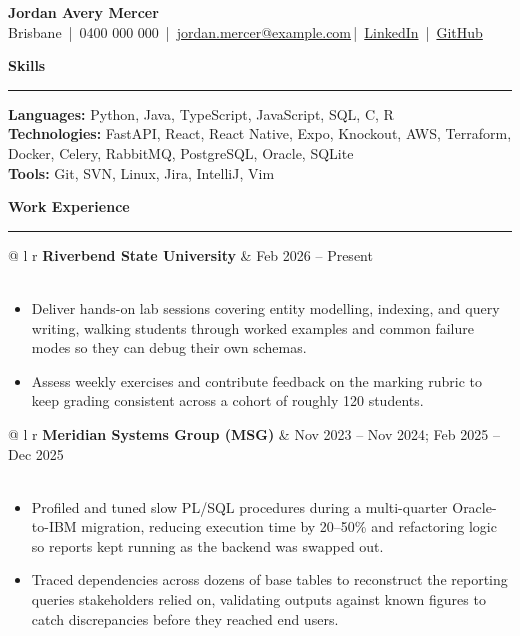 \documentclass[a4paper,10pt]{article}
\newcommand{\resheading}[1]{%
  \vspace{0.8ex}%
  \noindent\textbf{\large #1}\\[-2.0ex]
  \rule{\textwidth}{0.4pt}\vspace{0ex}
}
\begin{document}
\begin{center}
    {\LARGE \textbf{Jordan Avery Mercer}}\\[2pt]
    Brisbane \,|\, 0400 000 000 \,|\, \href{mailto:jordan.mercer@example.com}{jordan.mercer@example.com}\,|\, \href{https://www.linkedin.com/in/example-profile/}{LinkedIn} \,|\, \href{https://github.com/example-user}{GitHub}
\end{center}
\vspace{-3ex} 
\resheading{Skills}
\noindent\textbf{Languages:}
Python, Java, TypeScript, JavaScript, SQL, C, R\\[2pt]
\textbf{Technologies:}
FastAPI, React, React Native, Expo, Knockout, AWS, Terraform, Docker, Celery, RabbitMQ, PostgreSQL, Oracle, SQLite\\[2pt]
\textbf{Tools:}
Git, SVN, Linux, Jira, IntelliJ, Vim

\resheading{Work Experience}
\noindent
\begin{tabular*}{\textwidth}{@{\extracolsep{\fill}} l r}
\textbf{Riverbend State University} & Feb 2026 -- Present \\
 \\
\end{tabular*}
\vspace{-1.5ex}
\begin{itemize}
    \item Deliver hands-on lab sessions covering entity modelling, indexing, and query writing, walking students through worked examples and common failure modes so they can debug their own schemas.
    \item Assess weekly exercises and contribute feedback on the marking rubric to keep grading consistent across a cohort of roughly 120 students.
\end{itemize}

\noindent
\begin{tabular*}{\textwidth}{@{\extracolsep{\fill}} l r}
\textbf{Meridian Systems Group (MSG)} & Nov 2023 -- Nov 2024; Feb 2025 -- Dec 2025\\
  \\
\end{tabular*}
\vspace{-1.5ex}
\begin{itemize}
    \item Profiled and tuned slow PL/SQL procedures during a multi-quarter Oracle-to-IBM migration, reducing execution time by 20–50\% and refactoring logic so reports kept running as the backend was swapped out.
    \item Traced dependencies across dozens of base tables to reconstruct the reporting queries stakeholders relied on, validating outputs against known figures to catch discrepancies before they reached end users.
\end{itemize}
\end{document}
